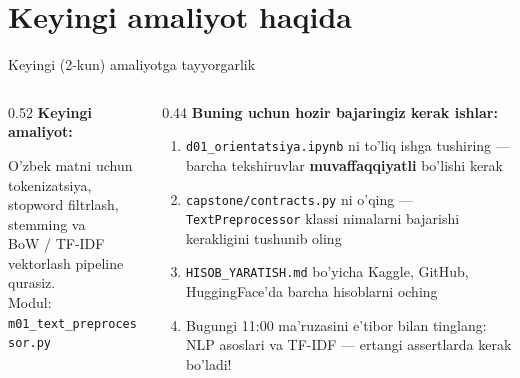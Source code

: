 \documentclass[aspectratio=169,11pt]{beamer}
\begin{document}
\section[Ertaga]{Keyingi amaliyot haqida}

\begin{frame}{Keyingi (2-kun) amaliyotga tayyorgarlik}
  \begin{columns}
    \begin{column}{0.52\textwidth}
      \textbf{Keyingi amaliyot:}\\[4pt]
      \begin{tcolorbox}[defbox,title=P1 --- TextPreprocessor]
        \small
        O'zbek matni uchun tokenizatsiya,\\
        stopword filtrlash, stemming va\\
        BoW / TF-IDF vektorlash pipeline qurasiz.\\[4pt]
        Modul: \texttt{m01\_text\_preprocessor.py}
      \end{tcolorbox}
    \end{column}
    \begin{column}{0.44\textwidth}
      \textbf{Buning uchun hozir bajaringiz kerak ishlar:}
      \begin{enumerate}\setlength\itemsep{4pt}
        \item \texttt{d01\_orientatsiya.ipynb} ni to'liq ishga tushiring ---
              barcha tekshiruvlar \textbf{muvaffaqqiyatli} bo'lishi kerak
        \item \texttt{capstone/contracts.py} ni o'qing ---
              \texttt{TextPreprocessor} klassi nimalarni bajarishi kerakligini tushunib oling
        \item \texttt{HISOB\_YARATISH.md} bo'yicha Kaggle, GitHub, HuggingFace'da barcha hisoblarni oching
        \item Bugungi 11:00 ma'ruzasini e'tibor bilan tinglang:
              NLP asoslari va TF-IDF --- ertangi assertlarda kerak bo'ladi!
      \end{enumerate}
    \end{column}
  \end{columns}
\end{frame}
\end{document}
